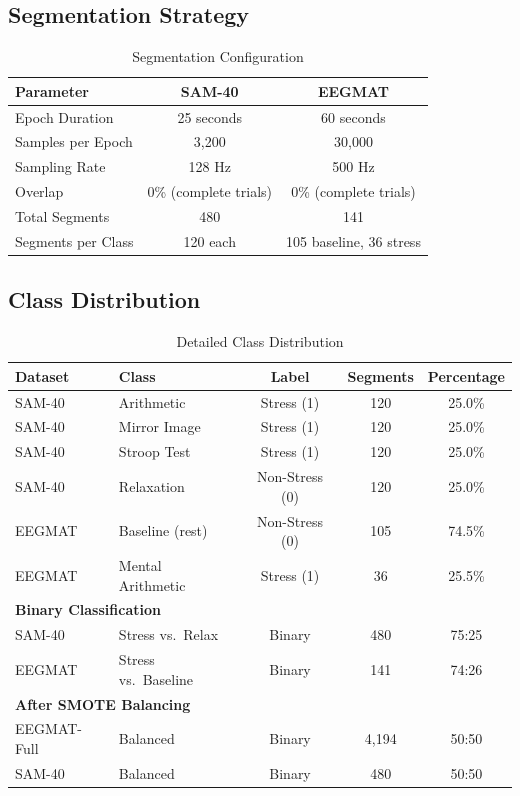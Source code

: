 \documentclass[11pt,a4paper]{article}
\begin{document}
\subsection{Segmentation Strategy}

\begin{table}[H]
\centering
\caption{Segmentation Configuration}
\small
\begin{tabular}{lcc}
\toprule
\textbf{Parameter} & \textbf{SAM-40} & \textbf{EEGMAT} \\
\midrule
Epoch Duration & 25 seconds & 60 seconds \\
Samples per Epoch & 3,200 & 30,000 \\
Sampling Rate & 128 Hz & 500 Hz \\
Overlap & 0\% (complete trials) & 0\% (complete trials) \\
Total Segments & 480 & 141 \\
Segments per Class & 120 each & 105 baseline, 36 stress \\
\bottomrule
\end{tabular}
\end{table}

\subsection{Class Distribution}

\begin{table}[H]
\centering
\caption{Detailed Class Distribution}
\small
\begin{tabular}{llccc}
\toprule
\textbf{Dataset} & \textbf{Class} & \textbf{Label} & \textbf{Segments} & \textbf{Percentage} \\
\midrule
SAM-40 & Arithmetic & Stress (1) & 120 & 25.0\% \\
SAM-40 & Mirror Image & Stress (1) & 120 & 25.0\% \\
SAM-40 & Stroop Test & Stress (1) & 120 & 25.0\% \\
SAM-40 & Relaxation & Non-Stress (0) & 120 & 25.0\% \\
\midrule
EEGMAT & Baseline (rest) & Non-Stress (0) & 105 & 74.5\% \\
EEGMAT & Mental Arithmetic & Stress (1) & 36 & 25.5\% \\
\midrule
\multicolumn{2}{l}{\textbf{Binary Classification}} & & & \\
SAM-40 & Stress vs.\ Relax & Binary & 480 & 75:25 \\
EEGMAT & Stress vs.\ Baseline & Binary & 141 & 74:26 \\
\midrule
\multicolumn{2}{l}{\textbf{After SMOTE Balancing}} & & & \\
EEGMAT-Full & Balanced & Binary & 4,194 & 50:50 \\
SAM-40 & Balanced & Binary & 480 & 50:50 \\
\bottomrule
\end{tabular}
\end{table}
\end{document}
